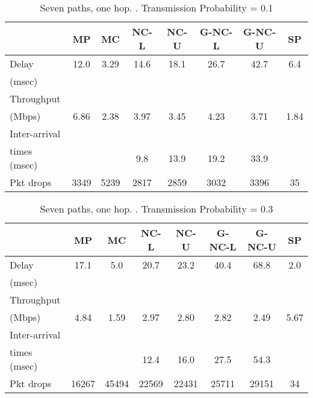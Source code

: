 \documentclass[journal, onecolumn, 12pt]{IEEEtran}
\begin{document}
\begin{table}[hb]
\begin{center}
\scriptsize
\begin{tabular}{|l|c|c|c|c|c|c|c|}
\hline
~                                   & MP & MC & NC-L & NC-U & G-NC-L & G-NC-U & SP \\ \hline
Delay           &  12.0 & 3.29 & 14.6 & 18.1 & 26.7 & 42.7 & 6.4\\
(msec)           &   &  &   &   &   &  &  \\ \hline
Throughput             & ~  & ~  & ~    & ~    & ~           & ~           & ~  \\
(Mbps)                 & 6.86 & 2.38  & 3.97 & 3.45 & 4.23 & 3.71 & 1.84 \\ \hline
Inter-arrival             & ~  & ~  & ~    & ~    & ~           & ~           & ~  \\
times (msec)   &   &   & 9.8 & 13.9 & 19.2 & 33.9 &  \\ \hline
Pkt drops       & 3349 & 5239 &  2817 & 2859  & 3032 & 3396 & 35 \\ \hline
\end{tabular}
\end{center}
\caption {Seven paths, one hop. . Transmission Probability = 0.1}
\label{tab:sim_topol_5_0.1}
\end{table}

\begin{table}[hb]
\begin{center}
\scriptsize
\begin{tabular}{|l|c|c|c|c|c|c|c|}
\hline
~                                   & MP & MC & NC-L & NC-U & G-NC-L & G-NC-U & SP \\ \hline
Delay           &  17.1 &  5.0 & 20.7 & 23.2 & 40.4 & 68.8 & 2.0\\
(msec)           &   &  &   &   &   &  &  \\ \hline
Throughput             & ~  & ~  & ~    & ~    & ~           & ~           & ~  \\
(Mbps)                 & 4.84 & 1.59 & 2.97 & 2.80 & 2.82 & 2.49 & 5.67\\ \hline
Inter-arrival             & ~  & ~  & ~    & ~    & ~           & ~           & ~  \\
times (msec)   &   &   & 12.4 & 16.0 & 27.5 & 54.3 &  \\ \hline
Pkt drops       & 16267 & 45494 &  22569 & 22431  & 25711 & 29151 & 34 \\ \hline
\end{tabular}
\end{center}
\caption {Seven paths, one hop. . Transmission Probability = 0.3}
\label{tab:sim_topol_5_0.3}
\end{table}
\end{document}
